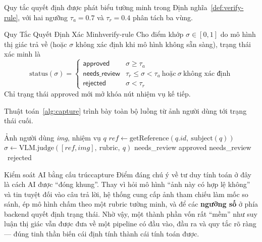 Quy tắc quyết định được phát biểu tường minh trong
Định nghĩa~\ref{def:verify-rule}, với hai ngưỡng $\tau_a = 0.7$ và
$\tau_r = 0.4$ phân tách ba vùng.

\begin{mydef}{Quy Tắc Quyết Định Xác Minh}{verify-rule}
Cho điểm khớp $\sigma \in [0,1]$ do mô hình thị giác trả về (hoặc $\sigma$
không xác định khi mô hình không sẵn sàng), trạng thái xác minh là
\[
\mathrm{status}(\sigma) =
\begin{cases}
\textsf{approved}      & \sigma \ge \tau_a \\
\textsf{needs\_review} & \tau_r \le \sigma < \tau_a \ \text{hoặc}\ \sigma\ \text{không xác định} \\
\textsf{rejected}      & \sigma < \tau_r
\end{cases}
\]
Chỉ trạng thái \textsf{approved} mới mở khóa nút nhiệm vụ kế tiếp.
\end{mydef}

Thuật toán~\ref{alg:capture} trình bày toàn bộ luồng từ ảnh người dùng
tới trạng thái cuối.

\begin{algorithm}[H]
\caption{Ánh xạ điểm rubric sang trạng thái xác minh}
\label{alg:capture}
\begin{algorithmic}[1]
\Require Ảnh người dùng \textit{img}, nhiệm vụ $q$
\State $\textit{ref} \gets \mathrm{getReference}(q.\textit{id},\ \mathrm{subject}(q))$ 
\State $\sigma \gets \mathrm{VLM.judge}([\textit{ref}, \textit{img}],\ \text{rubric},\ q)$ \Comment{$\in [0,1]$}
 \State \Return \textsf{needs\_review} \EndIf
{} \State \Return \textsf{approved}
 \State \Return \textsf{needs\_review}
\Else\ \State \Return \textsf{rejected}
\EndIf
\end{algorithmic}
\end{algorithm}

\begin{myinsight}{Kiểm soát AI bằng cấu trúc}{capture}
Điểm đáng chú ý về tư duy tính toán ở đây là cách AI được ``đóng khung''.
Thay vì hỏi mô hình ``ảnh này có hợp lệ không'' và tin tuyệt đối vào câu
trả lời, hệ thống cung cấp ảnh tham chiếu làm mốc so sánh, ép mô hình
chấm theo một rubric tường minh, và để các \textbf{ngưỡng số} ở phía
backend quyết định trạng thái. Nhờ vậy, một thành phần vốn rất ``mềm''
như suy luận thị giác vẫn được đưa về một pipeline có đầu vào, đầu ra và
quy tắc rõ ràng --- đúng tinh thần biến cái định tính thành cái tính
toán được.
\end{myinsight}

